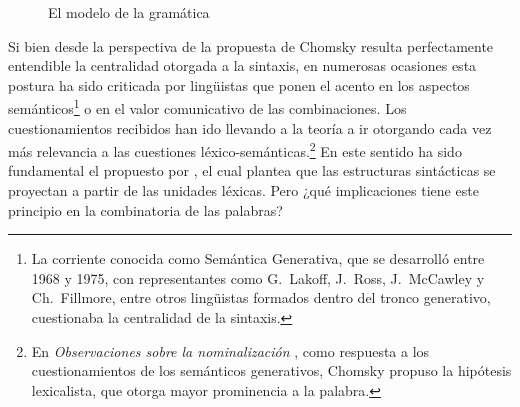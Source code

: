 \begin{figure}[htbp]
  \centering
  \caption{El modelo de la gramática}\label{fig:01-modelo}
\end{figure}

Si bien desde la perspectiva de la propuesta de Chomsky resulta perfectamente
entendible la centralidad otorgada a la sintaxis, en numerosas ocasiones esta
postura ha sido criticada por lingüistas que ponen el acento en los aspectos
semánticos\footnote{La corriente conocida como Semántica Generativa, que se
desarrolló entre 1968 y 1975, con representantes como G.~Lakoff, J.~Ross,
J.~McCawley y Ch.~Fillmore, entre otros lingüistas formados dentro del tronco
generativo, cuestionaba la centralidad de la sintaxis.} o en el valor
comunicativo de las combinaciones. Los cuestionamientos recibidos han ido
llevando a la teoría a ir otorgando cada vez más relevancia a las cuestiones
léxico-semánticas.\footnote{En \textit{Observaciones sobre la nominalización}
\parencite{chomsky1974b}, como respuesta a los cuestionamientos de los
semánticos generativos, Chomsky propuso la hipótesis lexicalista, que otorga
mayor prominencia a la palabra.} En este sentido ha sido fundamental el
 propuesto por \textcite{chomsky1981}, el cual
plantea que las estructuras sintácticas se proyectan a partir de las unidades
léxicas. Pero ¿qué implicaciones tiene este principio en la combinatoria de las
palabras?

